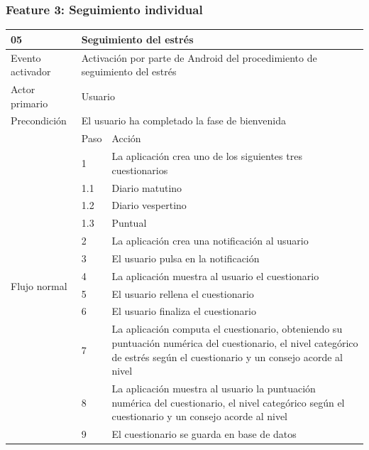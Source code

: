     \subsubsection{Feature 3: Seguimiento individual}

    \begin{table}[h]
        \centering
        \begin{tabularx}{\textwidth}{|l|l|X|}
            \hline
            05 & \multicolumn{2}{|X|}{Seguimiento del estrés} \\
            \hline
            Evento activador & \multicolumn{2}{|X|}{Activación por parte de Android del procedimiento de seguimiento del estrés} \\
            \hline
            Actor primario & \multicolumn{2}{|X|}{Usuario} \\
            \hline
            Precondición & \multicolumn{2}{|X|}{El usuario ha completado la fase de bienvenida} \\
            \hline
            \multirow{13}{*}{Flujo normal} & Paso & Acción \\
            \cline{2-3} & 1 & La aplicación crea uno de los siguientes tres cuestionarios \\
            \cline{2-3} & 1.1 & Diario matutino \\
            \cline{2-3} & 1.2 & Diario vespertino \\
            \cline{2-3} & 1.3 & Puntual \\
            \cline{2-3} & 2 & La aplicación crea una notificación al usuario \\
            \cline{2-3} & 3 & El usuario pulsa en la notificación \\
            \cline{2-3} & 4 & La aplicación muestra al usuario el cuestionario \\
            \cline{2-3} & 5 & El usuario rellena el cuestionario \\
            \cline{2-3} & 6 & El usuario finaliza el cuestionario \\
            \cline{2-3} & 7 & La aplicación computa el cuestionario, obteniendo su puntuación numérica del cuestionario, el nivel categórico de estrés según el cuestionario y un consejo acorde al nivel \\
            \cline{2-3} & 8 & La aplicación muestra al usuario la puntuación numérica del cuestionario, el nivel categórico según el cuestionario y un consejo acorde al nivel \\
            \cline{2-3} & 9 & El cuestionario se guarda en base de datos \\

\end{tabularx}
\end{table}
